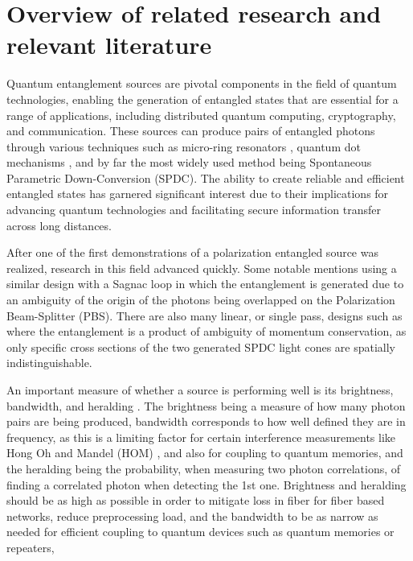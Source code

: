 \documentclass{article}
\theoremstyle{mytheoremstyle}
\theoremstyle{mytheoremstyle}
\theoremstyle{myproblemstyle}
\begin{document}
\section{Overview of related research and relevant literature}
Quantum entanglement sources are pivotal components in the field of quantum technologies, enabling the generation of entangled states
that are essential for a range of applications, including distributed quantum computing, cryptography, and communication.
These sources can produce pairs of entangled photons through various techniques such as micro-ring resonators \cite{Wakabayashi_2015},
quantum dot mechanisms \cite{Rota_2024}, and by far the most widely used method being Spontaneous Parametric Down-Conversion \cite{jesseSPDC} (SPDC).
The ability to create reliable and efficient entangled states has garnered significant interest due to their
implications for advancing quantum technologies and facilitating secure information transfer across long distances.
\par After one of the first \cite{Kwiat_1995} demonstrations of a polarization entangled source was realized,
research in this field advanced quickly. Some notable mentions using a similar design with a Sagnac loop
\cite{Neumann_Buchner_Bulla_Bohmann_Ursin_2022_CW,Chen_Ecker_Wengerowsky_Bulla_Joshi_Steinlechner_Ursin_2018_CW}
in which the entanglement is generated due to an ambiguity of the origin of the photons being overlapped on the Polarization Beam-Splitter (PBS).
There are also many linear, or single pass, designs such as \cite{Lee_Kim_Cha_Moon_2016,Kwiat_Mattle_Weinfurter_Zeilinger_Sergienko_Shih_1995}
where the entanglement is a product of ambiguity of momentum conservation, as only specific cross sections of the two generated SPDC light
cones are spatially indistinguishable.
\par An important measure of whether a source is performing well is its brightness, bandwidth, and heralding \cite{Bennink_2010,Ljunggren_Tengner_Marsden_Pelton_2006}.
The brightness being a measure of how many photon pairs are being produced, bandwidth corresponds to how well defined they are in frequency,
as this is a limiting factor for certain interference measurements like
Hong Oh and Mandel (HOM) \cite{Hong_Ou_Mandel_1987}, and also for coupling to quantum memories,
and the heralding being the probability, when measuring two photon correlations, of finding a correlated photon when detecting the 1st one.
Brightness and heralding should be as high as possible in order to mitigate loss in fiber for fiber based networks,
reduce preprocessing load, and the bandwidth to be as narrow as needed for efficient coupling to quantum devices such as quantum memories or repeaters,
\end{document}

